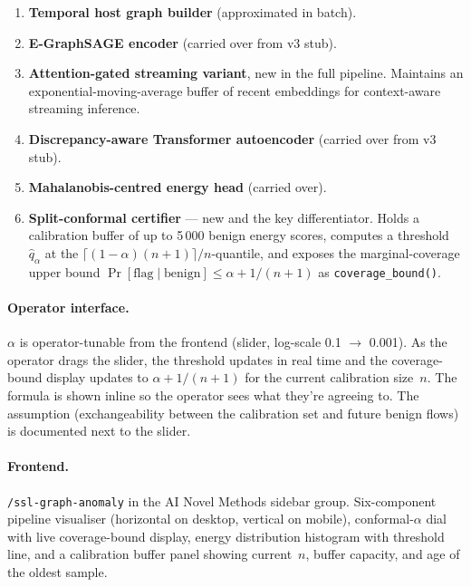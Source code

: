 \documentclass[11pt,a4paper]{article}
\begin{document}
\begin{enumerate}[nosep,leftmargin=*]
  \item \textbf{Temporal host graph builder} (approximated in batch).
  \item \textbf{E-GraphSAGE encoder} (carried over from v3 stub).
  \item \textbf{Attention-gated streaming variant}, new in the full
        pipeline.  Maintains an exponential-moving-average buffer of
        recent embeddings for context-aware streaming inference.
  \item \textbf{Discrepancy-aware Transformer autoencoder}
        (carried over from v3 stub).
  \item \textbf{Mahalanobis-centred energy head} (carried over).
  \item \textbf{Split-conformal certifier} --- new and the key
        differentiator.  Holds a calibration buffer of up to 5\,000
        benign energy scores, computes a threshold $\hat q_\alpha$ at
        the \(\lceil(1-\alpha)(n+1)\rceil / n\)-quantile, and exposes
        the marginal-coverage upper bound
        \(\Pr[\text{flag} \mid \text{benign}] \le \alpha + 1/(n+1)\)
        as \texttt{coverage\_bound()}.
\end{enumerate}

\paragraph{Operator interface.}
\(\alpha\) is operator-tunable from the frontend (slider, log-scale
0.1 $\to$ 0.001).  As the operator drags the slider, the threshold
updates in real time and the coverage-bound display updates to
\(\alpha + 1/(n+1)\) for the current calibration size~\(n\).  The
formula is shown inline so the operator sees what they're agreeing
to.  The assumption (exchangeability between the calibration set and
future benign flows) is documented next to the slider.

\paragraph{Frontend.}
\texttt{/ssl-graph-anomaly} in the AI Novel Methods sidebar group.
Six-component pipeline visualiser (horizontal on desktop, vertical
on mobile), conformal-\(\alpha\) dial with live coverage-bound
display, energy distribution histogram with threshold line, and a
calibration buffer panel showing current~\(n\), buffer capacity, and
age of the oldest sample.
\end{document}
